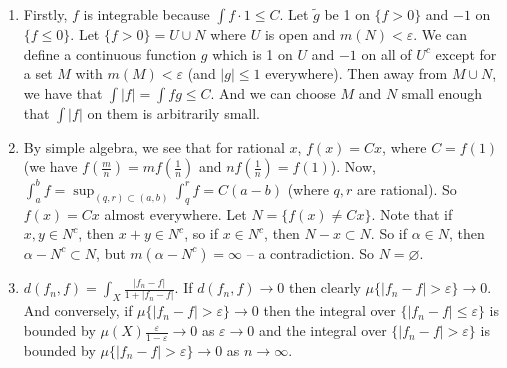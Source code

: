 \documentclass{article}
\begin{document}
\begin{enumerate}
  \item Firstly, $f$ is integrable because $\int f \cdot 1 \leq C$. Let $\tilde
     g$ be 1 on $\{f > 0\}$ and $-1$ on $\{f \leq 0\}$. Let $\{f > 0\} = U \cup
     N$ where $U$ is open and $m(N) < \varepsilon$. We can define a continuous
     function $g$ which is 1 on $U$ and $-1$ on all of $U^c$ except for a set
     $M$ with $m(M) < \varepsilon$ (and $|g| \leq 1$ everywhere). Then away from
     $M \cup N$, we have that $\int |f| = \int fg \leq C$. And we can choose $M$
     and $N$ small enough that $\int |f|$ on them is arbitrarily small.

  \item By simple algebra, we see that for rational $x$, $f(x) = Cx$, where $C =
     f(1)$ (we have $f(\frac mn) = mf(\frac1n)$ and $nf(\frac1n)=f(1)$). Now,
     $\int_a^b f = \sup_{(q,r) \subset (a,b)} \int_q^r f = C(a-b)$ (where $q,r$
     are rational). So $f(x) = Cx$ almost everywhere. Let $N = \{f(x) \neq
     Cx\}$. Note that if $x,y \in N^c$, then $x+y \in N^c$, so if $x \in N^c$,
     then $N - x \subset N$. So if $\alpha \in N$, then $\alpha - N^c \subset
     N$, but $m(\alpha-N^c) = \infty$ -- a contradiction. So $N = \varnothing$.
     
  \item $d(f_n,f) = \int_X \frac{|f_n-f|}{1+|f_n-f|}$. If $d(f_n,f) \to 0$ then
     clearly $\mu\{|f_n-f|>\varepsilon\} \to 0$. And conversely, if
     $\mu\{|f_n-f|>\varepsilon\} \to 0$ then the integral over
     $\{|f_n-f|\leq\varepsilon\}$ is bounded by
     $\mu(X)\frac\varepsilon{1-\varepsilon} \to 0$ as $\varepsilon \to 0$ and
     the integral over $\{|f_n-f|>\varepsilon\}$ is bounded by
     $\mu\{|f_n-f|>\varepsilon\} \to 0$ as $n \to \infty$.

\end{enumerate}
\end{document}

